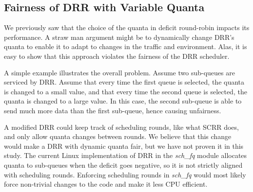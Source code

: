 


\subsection{Fairness of DRR with Variable Quanta}
\label{sub:variable-quanta}

We previously saw that the choice of the quanta in deficit round-robin impacts its
performance. A straw man argument might be to dynamically change DRR's quanta to enable it to adapt to changes in the traffic and environment. Alas, it is easy to show that this approach violates the fairness of the DRR scheduler.

A simple example illustrates the overall problem. Assume two
sub-queues are serviced by DRR. Assume that every time the first queue
is selected, the quanta is changed to a small value, and that every
time the second queue is selected, the quanta is changed to a large value. In this case, the second sub-queue is able to send much more data than the first sub-queue, hence causing unfairness.

A modified DRR could keep track of scheduling rounds, like what SCRR
does, and only allow quanta changes between rounds. We believe that
this change would make a DRR with dynamic quanta fair, but we have not
proven it in this study. The current Linux implementation of DRR in
the \textit{sch\_fq} module \cite{sch-fq} allocates quanta to
sub-queues when the deficit goes negative, so it is not strictly
aligned with scheduling rounds. Enforcing scheduling rounds in
\textit{sch\_fq} would most likely force non-trivial changes to the
code and make it less CPU efficient.